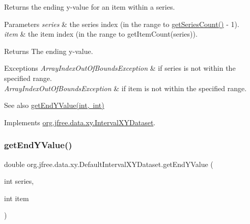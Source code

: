 Returns the ending y-\/value for an item within a series.


\begin{DoxyParams}{Parameters}
{\em series} & the series index (in the range {} to {\ttfamily \mbox{\hyperlink{classorg_1_1jfree_1_1data_1_1xy_1_1_default_interval_x_y_dataset_a11470bfa9b540c971123d4282c0f5a8a}{get\+Series\+Count()}} -\/ 1}). \\
\hline
{\em item} & the item index (in the range {} to {\ttfamily get\+Item\+Count(series)}).\\
\hline
\end{DoxyParams}
\begin{DoxyReturn}{Returns}
The ending y-\/value.
\end{DoxyReturn}

\begin{DoxyExceptions}{Exceptions}
{\em Array\+Index\+Out\+Of\+Bounds\+Exception} & if {\ttfamily series} is not within the specified range. \\
\hline
{\em Array\+Index\+Out\+Of\+Bounds\+Exception} & if {\ttfamily item} is not within the specified range.\\
\hline
\end{DoxyExceptions}
\begin{DoxySeeAlso}{See also}
\mbox{\hyperlink{classorg_1_1jfree_1_1data_1_1xy_1_1_default_interval_x_y_dataset_a4c259724fd0f58a34c3b0f2ea3825bc5}{get\+End\+Y\+Value(int, int)}} 
\end{DoxySeeAlso}


Implements \mbox{\hyperlink{interfaceorg_1_1jfree_1_1data_1_1xy_1_1_interval_x_y_dataset_ae938af574bad07e7f47a8b423223ef9b}{org.\+jfree.\+data.\+xy.\+Interval\+X\+Y\+Dataset}}.

\mbox{\label{classorg_1_1jfree_1_1data_1_1xy_1_1_default_interval_x_y_dataset_a4c259724fd0f58a34c3b0f2ea3825bc5}} 
\subsubsection{\texorpdfstring{get\+End\+Y\+Value()}{getEndYValue()}}
{\footnotesize\ttfamily double org.\+jfree.\+data.\+xy.\+Default\+Interval\+X\+Y\+Dataset.\+get\+End\+Y\+Value (\begin{DoxyParamCaption}\item[{int}]{series,  }\item[{int}]{item }\end{DoxyParamCaption})}

